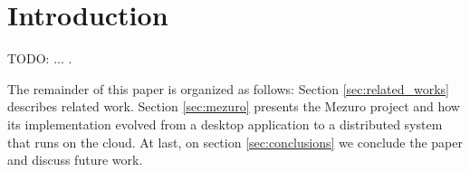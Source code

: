 \section{Introduction}
\label{introduction}

TODO: ... \cite{meirelles2013monitoramento}.

The remainder of this paper is organized as follows:
%
Section \ref{sec:related_works} describes related work.
%
Section \ref{sec:mezuro} presents the Mezuro project and how its implementation evolved from a desktop application to a distributed system that runs on the cloud.
%
At last, on section \ref{sec:conclusions} we conclude the paper and discuss future work.


